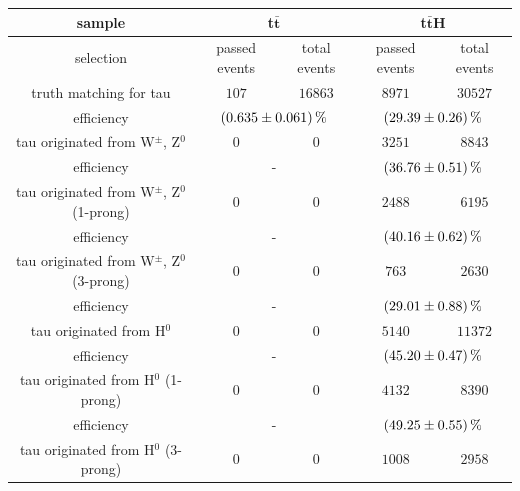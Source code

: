 \begin{table}
		\centering
                \footnotesize
                \renewcommand{\arraystretch}{1.2}
		\begin{tabular*}{\linewidth}{@{\extracolsep{\fill}}ccccc}
		\hline
		\hline
		 \textbf{sample}  & \multicolumn{2}{c}{\textbf{t$\bar{\textbf{t}}$}}  & \multicolumn{2}{c}{\textbf{t$\bar{\textbf{t}}$H}} 
		\\
		\hline
		selection  & passed events      & total events & passed events      & total events
		\\ 
		\hline
		truth matching for tau      & $107$            & $16863$      & $8971$        & $30527$
		\\
		efficiency                  & \multicolumn{2}{c}{$\SI{0.635\pm 0.061}{\percent}$}    & \multicolumn{2}{c}{$\SI{29.39\pm 0.26}{\percent}$}
		\\
		\hline
		tau originated from W$^{\pm}$, Z$^0$& $0$        & $0$         & $3251$          & $8843$
		\\
		efficiency                  & \multicolumn{2}{c}{-}   & \multicolumn{2}{c}{$\SI{36.76\pm 0.51}{\percent}$}
		\\
		\hline
                tau originated from W$^{\pm}$, Z$^0$ (1-prong)& $0$        & $0$         & $2488$          & $6195$
		\\
		efficiency                  & \multicolumn{2}{c}{-}   & \multicolumn{2}{c}{$\SI{40.16\pm 0.62}{\percent}$}
		\\
		\hline
                tau originated from W$^{\pm}$, Z$^0$ (3-prong)& $0$        & $0$         & $763$          & $2630$
		\\
		efficiency                  & \multicolumn{2}{c}{-}   & \multicolumn{2}{c}{$\SI{29.01\pm 0.88}{\percent}$}
		\\
		\hline
                tau originated from H$^0$& $0$        & $0$         & $5140$          & $11372$
		\\
		efficiency                  & \multicolumn{2}{c}{-}   & \multicolumn{2}{c}{$\SI{45.20\pm 0.47}{\percent}$}
		\\
		\hline
                tau originated from H$^0$ (1-prong)& $0$        & $0$         & $4132$          & $8390$
		\\
		efficiency                  & \multicolumn{2}{c}{-}   & \multicolumn{2}{c}{$\SI{49.25\pm 0.55}{\percent}$}
		\\
		\hline
                tau originated from H$^0$ (3-prong)& $0$        & $0$         & $1008$          & $2958$
		\\

\end{tabular*}
\end{table}
